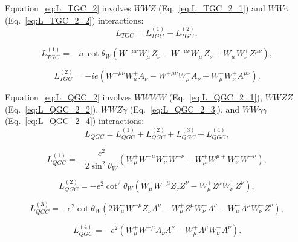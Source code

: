Equation~\ref{eq:L_TGC_2} involves $WWZ$ (Eq.~\ref{eq:L_TGC_2_1}) and $WW\gamma$ (Eq.~\ref{eq:L_TGC_2_2}) interactions:\\

\begin{equation} \label{eq:L_TGC_2}
L_{TGC} = L_{TGC}^{(1)} + L_{TGC}^{(2)},
\end{equation}

\begin{equation} \label{eq:L_TGC_2_1}
L_{TGC}^{(1)} = -ie \cot \theta_W (W^{-\mu\nu} W^{+}_\mu Z_\nu - W^{+\mu\nu} W^-_\mu Z_\nu +W^-_\mu W^+_\nu Z^{\mu\nu}),
\end{equation}

\begin{equation} \label{eq:L_TGC_2_2}
L_{TGC}^{(2)} = - ie(W^{-\mu\nu}W^+_\mu A_\nu - W^{+\mu\nu}W^-_\mu A_\nu + W^-_\mu W^+_\nu A^{\mu\nu}).
\end{equation}

Equation~\ref{eq:L_QGC_2} involves $WWWW$ (Eq.~\ref{eq:L_QGC_2_1}), $WWZZ$ (Eq.~\ref{eq:L_QGC_2_2}), $WWZ\gamma$ (Eq.~\ref{eq:L_QGC_2_3}), and $WW\gamma\gamma$ (Eq.~\ref{eq:L_QGC_2_4}) interactions:\\

\begin{equation} \label{eq:L_QGC_2}
L_{QGC} = L_{QGC}^{(1)} + L_{QGC}^{(2)} + L_{QGC}^{(3)} + L_{QGC}^{(4)},
\end{equation}

\begin{equation} \label{eq:L_QGC_2_1}
L_{QGC}^{(1)} = -\frac{e^2}{2\sin^2 \theta_W}(W^+_\mu W^{-\mu}W^+_\nu W^{-\nu} - W^+_\mu W^{\mu +} W^-_\nu W^{-\nu}),
\end{equation}

\begin{equation} \label{eq:L_QGC_2_2}
L_{QGC}^{(2)} = - e^2 \cot^2 \theta_W (W^+_\mu W^{-\mu} Z_\nu Z^{\nu} - W^+_\mu Z^{\mu} W^-_\nu Z^{\nu}),
\end{equation}

\begin{equation} \label{eq:L_QGC_2_3}
L_{QGC}^{(3)} = - e^2 \cot \theta_W (2 W_\mu^+ W^{-\mu} Z_\nu A^{\nu} - W^{+}_\mu Z^\mu W^-_\nu A^\nu - W^{+}_\mu A^\mu W^-_\nu Z^\nu),
\end{equation}

\begin{equation} \label{eq:L_QGC_2_4}
L_{QGC}^{(4)} = - e^2 (W^+_\mu W^{-\mu} A_\nu A^{\nu} - W^+_\mu A^{\mu} W^-_\nu A^{\nu}).
\end{equation}

